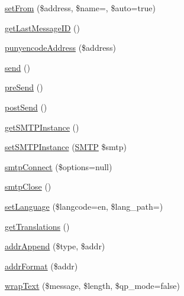 \begin{DoxyCompactItemize}
\item 
\hyperlink{classPHPMailer_1_1PHPMailer_1_1PHPMailer_a3de3655ad7d29985118fa6fbefebe46a}{set\+From} (\$address, \$name=\textquotesingle{}\textquotesingle{}, \$auto=true)
\item 
\hyperlink{classPHPMailer_1_1PHPMailer_1_1PHPMailer_ad53edfb7920dcd627f5f71e2a6584c15}{get\+Last\+Message\+ID} ()
\item 
\hyperlink{classPHPMailer_1_1PHPMailer_1_1PHPMailer_a3e8126f823b4c64bdf2b8c614cd22374}{punyencode\+Address} (\$address)
\item 
\hyperlink{classPHPMailer_1_1PHPMailer_1_1PHPMailer_a80ad2451096e940360c7439c22303edf}{send} ()
\item 
\hyperlink{classPHPMailer_1_1PHPMailer_1_1PHPMailer_a7ddedbf5d2a898f84d8d99c947740d2c}{pre\+Send} ()
\item 
\hyperlink{classPHPMailer_1_1PHPMailer_1_1PHPMailer_ae060a001c53211f8e48c6e200174e6a1}{post\+Send} ()
\item 
\hyperlink{classPHPMailer_1_1PHPMailer_1_1PHPMailer_ace53c3eab6221b084479efe01a01ed94}{get\+S\+M\+T\+P\+Instance} ()
\item 
\hyperlink{classPHPMailer_1_1PHPMailer_1_1PHPMailer_a15b28dbe8be012f10d2f2207f1d2e666}{set\+S\+M\+T\+P\+Instance} (\hyperlink{classPHPMailer_1_1PHPMailer_1_1SMTP}{S\+M\+TP} \$smtp)
\item 
\hyperlink{classPHPMailer_1_1PHPMailer_1_1PHPMailer_a2629420e899a9191658e7a041e7d447c}{smtp\+Connect} (\$options=null)
\item 
\hyperlink{classPHPMailer_1_1PHPMailer_1_1PHPMailer_a8a951b4ef608e83af7b127b8c2897b79}{smtp\+Close} ()
\item 
\hyperlink{classPHPMailer_1_1PHPMailer_1_1PHPMailer_a76ed5e99329ddb1e186858f832a1a212}{set\+Language} (\$langcode=\textquotesingle{}en\textquotesingle{}, \$lang\+\_\+path=\textquotesingle{}\textquotesingle{})
\item 
\hyperlink{classPHPMailer_1_1PHPMailer_1_1PHPMailer_a48e6719b93132b0098cdddcfbca0aa85}{get\+Translations} ()
\item 
\hyperlink{classPHPMailer_1_1PHPMailer_1_1PHPMailer_afa5abbb95aa34ed4fa291e7a9a48096c}{addr\+Append} (\$type, \$addr)
\item 
\hyperlink{classPHPMailer_1_1PHPMailer_1_1PHPMailer_aec3fc10f7e3bfc9dbdaead473b3d806e}{addr\+Format} (\$addr)
\item 
\hyperlink{classPHPMailer_1_1PHPMailer_1_1PHPMailer_a94a6b50e8ce53dd6ddd1d4d5341adc73}{wrap\+Text} (\$message, \$length, \$qp\+\_\+mode=false)

\end{DoxyCompactItemize}
